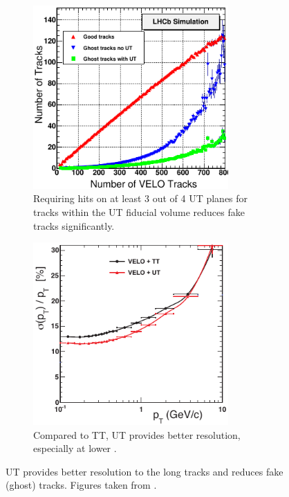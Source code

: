 \begin{figure}[!htb]
    \centering
    \begin{subfigure}[t]{0.48\textwidth}
        \centering
        \includegraphics[width=0.82\textwidth]{./figs-lhcb-upgrade-overview/tracking/ut_ghost_improvement.pdf}
        \caption{
             Requiring hits on at least 3 out of 4 UT planes for tracks within
             the UT fiducial volume reduces fake tracks significantly.
        }
    \end{subfigure}
    \hspace{10pt}
    \begin{subfigure}[t]{0.48\textwidth}
        \centering
        \includegraphics[width=0.82\textwidth]{./figs-lhcb-upgrade-overview/tracking/ut_pt_improvement.pdf}
        \caption{
            Compared to TT,
            UT provides better \pt resolution, especially at lower \pt.
        }
    \end{subfigure}
    \caption{
        UT provides better \pt resolution to the long tracks and reduces fake
        (ghost) tracks.
        Figures taken from \cite{Wang:2015mem}.
    }
    \label{fig:ut-pt-improvement}
\end{figure}

